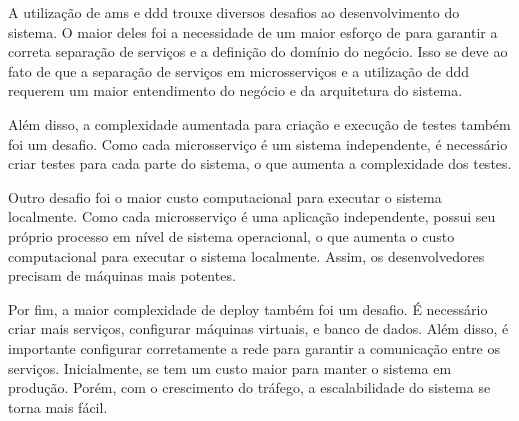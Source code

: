 A utilização de \acrshort{ams} e \acrshort{ddd} trouxe diversos desafios ao desenvolvimento do sistema. O maior deles foi a necessidade de um maior esforço de  para garantir a correta separação de serviços e a definição do domínio do negócio. Isso se deve ao fato de que a separação de serviços em microsserviços e a utilização de \acrshort{ddd} requerem um maior entendimento do negócio e da arquitetura do sistema.

Além disso, a complexidade aumentada para criação e execução de testes também foi um desafio. Como cada microsserviço é um sistema independente, é necessário criar testes para cada parte do sistema, o que aumenta a complexidade dos testes.

Outro desafio foi o maior custo computacional para executar o sistema localmente. Como cada microsserviço é uma aplicação independente, possui seu próprio processo em nível de sistema operacional, o que aumenta o custo computacional para executar o sistema localmente. Assim, os desenvolvedores precisam de máquinas mais potentes.

Por fim, a maior complexidade de deploy também foi um desafio. É necessário criar mais serviços, configurar máquinas virtuais,  e banco de dados. Além disso, é importante configurar corretamente a rede para garantir a comunicação entre os serviços. Inicialmente, se tem um custo maior para manter o sistema em produção. Porém, com o crescimento do tráfego, a escalabilidade do sistema se torna mais fácil.
